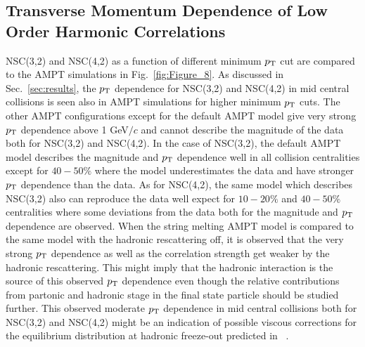 \documentclass[ALICE,manyauthors]{cernphprep}
\begin{document}
\subsection{Transverse Momentum Dependence of Low Order Harmonic Correlations}
\label{sec:ptdepsc}
NSC(3,2) and NSC(4,2) as a function of different minimum $p_{\rm T}$ cut are compared to the {AMPT} simulations in Fig.~\ref{fig:Figure_8}.
As discussed in Sec.~\ref{sec:results}, the $p_{\rm T}$ dependence for NSC(3,2) and NSC(4,2) in mid central collisions is seen also in AMPT simulations for higher minimum $p_{\rm T}$ cuts.
The other AMPT configurations except for the default AMPT model give very strong $p_{\rm T}$ dependence above 1 GeV$/c$ and cannot describe the magnitude of the data both for NSC(3,2) and NSC(4,2).
In the case of NSC(3,2), the default AMPT model describes the magnitude and $p_{\rm T}$ dependence well in all collision centralities except for $40-50\%$ where the model underestimates the data and have stronger $p_{\rm T}$ dependence than the data.
As for  NSC(4,2), the same model which describes NSC(3,2) also can reproduce the data well expect for $10-20\%$ and $40-50\%$ centralities where some deviations from the data both for the magnitude and $p_{\rm T}$ dependence are observed.
When the string melting AMPT model is compared to the same model with the hadronic rescattering off, it is observed that the very strong $p_{\rm T}$ dependence as well as the correlation strength get weaker by the hadronic rescattering.
This might imply that the hadronic interaction is the source of this observed $p_{\rm T}$ dependence even though the relative contributions from partonic and hadronic stage in the final state particle should be studied further.
This observed moderate $p_{\rm T}$ dependence in mid central collisions both for NSC(3,2) and NSC(4,2) might be an indication of possible viscous corrections for the equilibrium distribution at hadronic freeze-out predicted in ~\cite{Luzum:2010ad}.
\end{document}
